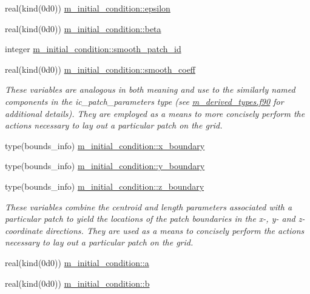 \begin{DoxyCompactItemize}
\item 
real(kind(0d0)) \hyperlink{namespacem__initial__condition_a0fb096d74052e49545e6ec72b3c2a114}{m\+\_\+initial\+\_\+condition\+::epsilon}
\item 
real(kind(0d0)) \hyperlink{namespacem__initial__condition_aa61b446189c2c88bb9261649f4b594b3}{m\+\_\+initial\+\_\+condition\+::beta}
\item 
integer \hyperlink{namespacem__initial__condition_adf36787dd781f2f28d1b49d06116c401}{m\+\_\+initial\+\_\+condition\+::smooth\+\_\+patch\+\_\+id}
\item 
real(kind(0d0)) \hyperlink{namespacem__initial__condition_a7ab7ae2808ac3b52319477860c6dbf80}{m\+\_\+initial\+\_\+condition\+::smooth\+\_\+coeff}
\begin{DoxyCompactList}\small\item\em These variables are analogous in both meaning and use to the similarly named components in the ic\+\_\+patch\+\_\+parameters type (see \hyperlink{m__derived__types_8f90}{m\+\_\+derived\+\_\+types.\+f90} for additional details). They are employed as a means to more concisely perform the actions necessary to lay out a particular patch on the grid. \end{DoxyCompactList}\item 
type(bounds\+\_\+info) \hyperlink{namespacem__initial__condition_abcd86e737c47247631a1fb95c1764b00}{m\+\_\+initial\+\_\+condition\+::x\+\_\+boundary}
\item 
type(bounds\+\_\+info) \hyperlink{namespacem__initial__condition_ab669c9fbfa80cdc9139ea45f293b7f49}{m\+\_\+initial\+\_\+condition\+::y\+\_\+boundary}
\item 
type(bounds\+\_\+info) \hyperlink{namespacem__initial__condition_aaae7053fde0b060e39db9f943f000389}{m\+\_\+initial\+\_\+condition\+::z\+\_\+boundary}
\begin{DoxyCompactList}\small\item\em These variables combine the centroid and length parameters associated with a particular patch to yield the locations of the patch boundaries in the x-\/, y-\/ and z-\/coordinate directions. They are used as a means to concisely perform the actions necessary to lay out a particular patch on the grid. \end{DoxyCompactList}\item 
real(kind(0d0)) \hyperlink{namespacem__initial__condition_a8a559b4d7a1e1e69f5e3b9ea0474e3fa}{m\+\_\+initial\+\_\+condition\+::a}
\item 
real(kind(0d0)) \hyperlink{namespacem__initial__condition_a0932a1bcb9b0293f1368e204a8fda4b9}{m\+\_\+initial\+\_\+condition\+::b}

\end{DoxyCompactItemize}
